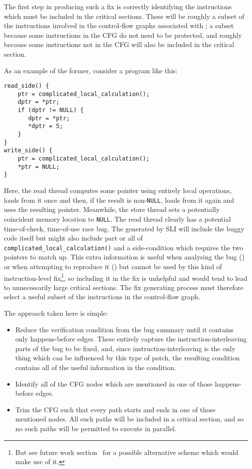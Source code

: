 The first step in producing such a fix is correctly identifying the
instructions which must be included in the critical sections.  These
will be roughly a subset of the instructions involved in the
control-flow graphs associated with \StateMachines; a subset because
some instructions in the CFG do not need to be protected, and roughly
because some instructions not in the CFG will also be included in the
critical section.

As an example of the former, consider a program like this:

\begin{verbatim}
read_side() {
    ptr = complicated_local_calculation();
    dptr = *ptr;
    if (dptr != NULL) {
       dptr = *ptr;
       *dptr = 5;
    }
}
write_side() {
    ptr = complicated_local_calculation();
    *ptr = NULL;
}
\end{verbatim}

Here, the read thread computes some pointer using entirely local
operations, loads from it once and then, if the result is
non-\verb|NULL|, loads from it again and uses the resulting pointer.
Meanwhile, the store thread sets a potentially coincident memory
location to \verb|NULL|.  The read thread clearly has a potential
time-of-check, time-of-use race bug.  The \StateMachines generated by
SLI will include the buggy code itself but might also include part or
all of \verb|complicated_local_calculation()| and a side-condition
which requires the two pointers to match up.  This extra information
is useful when analysing the bug (\needCite) or when attempting to
reproduce it (\needCite) but cannot be used by this kind of
instruction-level fix\footnote{But see future work section~\needCite
  for a possible alternative scheme which would make use of it.}, so
including it in the fix is unhelpful and would tend to lead to
unnecessarily large critical sections.  The fix generating process
must therefore select a useful subset of the instructions in the
control-flow graph.

The approach taken here is simple:

\begin{itemize}
\item
  Reduce the verification condition from the bug summary until it
  contains only happens-before edges.  These entirely capture the
  instruction-interleaving parts of the bug to be fixed, and, since
  instruction-interleaving is the only thing which can be influenced
  by this type of patch, the resulting condition contains all of the
  useful information in the condition.
\item
  Identify all of the CFG nodes which are mentioned in one of those
  happens-before edges.
\item
  Trim the CFG such that every path starts and ends in one of those
  mentioned nodes.  All such paths will be included in a critical
  section, and so no such paths will be permitted to execute in
  parallel.
\end{itemize}

